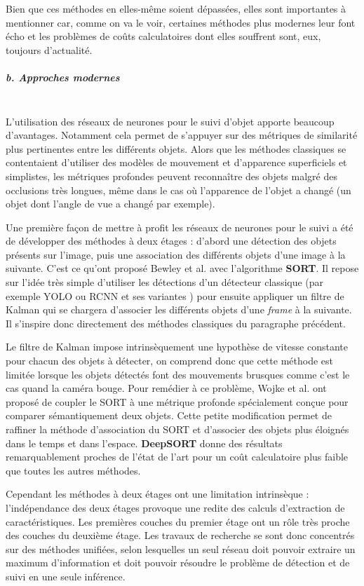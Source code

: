 \documentclass[10pt,twocolumn,letterpaper,french]{article}
\begin{document}
Bien que ces méthodes en elles-même soient dépassées, elles sont importantes à mentionner car, comme on va le voir, certaines méthodes plus modernes leur font écho et les problèmes de coûts calculatoires dont elles souffrent sont, eux, toujours d'actualité.

\subparagraph{b. Approches modernes\\\\} 

L'utilisation des réseaux de neurones pour le suivi d'objet apporte beaucoup d'avantages. Notamment cela permet de s'appuyer sur des métriques de similarité plus pertinentes entre les différents objets. Alors que les méthodes classiques se contentaient d'utiliser des modèles de mouvement et d'apparence superficiels et simplistes, les métriques profondes peuvent reconnaître des objets malgré des occlusions très longues, même dans le cas où l'apparence de l'objet a changé (un objet dont l'angle de vue a changé par exemple).

Une première façon de mettre à profit les réseaux de neurones pour le suivi a été de développer des méthodes à deux étages : d'abord une détection des objets présents sur l'image, puis une association des différents objets d'une image à la suivante. C'est ce qu'ont proposé Bewley et al. \cite{SORT} avec l'algorithme \textbf{SORT}. Il repose sur l'idée très simple d'utiliser les détections d'un détecteur classique (par exemple YOLO \cite{redmon2016look} ou RCNN et ses variantes \cite{girshick2014rich, girshick2015fast, ren2016faster}) pour ensuite appliquer un filtre de Kalman qui se chargera d'associer les différents objets d'une \textit{frame} à la suivante. Il s'inspire donc directement des méthodes classiques du paragraphe précédent.

Le filtre de Kalman impose intrinsèquement une hypothèse de vitesse constante pour chacun des objets à détecter, on comprend donc que cette méthode est limitée lorsque les objets détectés font des mouvements brusques comme c'est le cas quand la caméra bouge. Pour remédier à ce problème, Wojke et al. \cite{deepSORT} ont proposé de coupler le SORT à une métrique profonde spécialement conçue pour comparer sémantiquement deux objets. Cette petite modification permet de raffiner la méthode d'association du SORT et d'associer des objets plus éloignés dans le temps et dans l'espace. \textbf{DeepSORT} donne des résultats remarquablement proches de l'état de l'art pour un coût calculatoire plus faible que toutes les autres méthodes.

Cependant les méthodes à deux étages ont une limitation intrinsèque : l'indépendance des deux étages provoque une redite des calculs d'extraction de caractéristiques. Les premières couches du premier étage ont un rôle très proche des couches du deuxième étage. Les travaux de recherche se sont donc concentrés sur des méthodes unifiées, selon lesquelles un seul réseau doit pouvoir extraire un maximum d'information et doit pouvoir résoudre le problème de détection et de suivi en une seule inférence.
\end{document}
